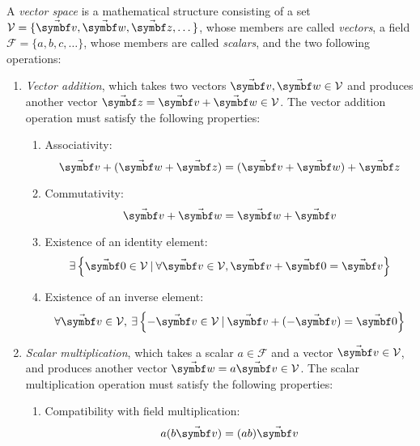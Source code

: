 A \emph{vector space} is a mathematical structure consisting of a set $\mathcal{V}=\{\vabs{v},\vabs{w},\vabs{z},\dots\}$, whose members are called \emph{vectors}, a field $\mathcal{F}=\{a,b,c,\dots\}$, whose members are called \emph{scalars}, and the two following operations:
\begin{enumerate}
\item \emph{Vector addition}, which takes two vectors $\vabs{v}, \vabs{w} \in \mathcal{V}$ and produces another vector $\vabs{z}=\vabs{v}+\vabs{w} \in \mathcal{V}$. The vector addition operation must satisfy the following properties:
\begin{enumerate}
	\item Associativity:
		\begin{equation} \label{Eq.Res.Vectors.Assoc}
		\vabs{v}+(\vabs{w}+\vabs{z})=(\vabs{v}+\vabs{w})+\vabs{z}
		\end{equation}
	\item Commutativity:
		\begin{equation} \label{Eq.Res.Vectors.Commut}
		\vabs{v}+\vabs{w}=\vabs{w}+\vabs{v}
		\end{equation}
	\item Existence of an identity element:
		\begin{equation} \label{Eq.Res.Vectors.AdditionId}
		\exists \left\{\vabs{0}\in\mathcal{V} \medspace \vert \medspace \forall \vabs{v}\in\mathcal{V}, \vabs{v}+\vabs{0}=\vabs{v}\right\}
		\end{equation}
	\item Existence of an inverse element:
		\begin{equation} \label{Eq.Res.Vectors.AdditionInv}
		\forall\vabs{v}\in\mathcal{V}, \medspace \exists \left\{-\vabs{v}\in\mathcal{V} \medspace \vert \medspace \vabs{v}+(-\vabs{v})=\vabs{0}\right\}
		\end{equation}
\end{enumerate}
\item \emph{Scalar multiplication}, which takes a scalar $a \in \mathcal{F}$ and a vector $\vabs{v} \in \mathcal{V}$, and produces another vector $\vabs{w}=a\vabs{v} \in \mathcal{V}$. The scalar multiplication operation must satisfy the following properties:
\begin{enumerate}
	\item Compatibility with field multiplication:
		\begin{equation} \label{Eq.Res.Vectors.Compatibility}
		a(b\vabs{v})=(ab)\vabs{v}
		\end{equation}

\end{enumerate}
\end{enumerate}
